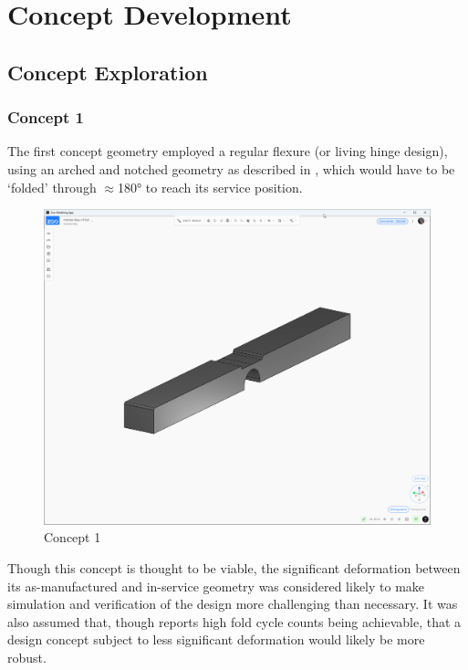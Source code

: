 \documentclass[10pt]{article}
\begin{document}
\section{Concept Development} \label{sec:concept-development}
\subsection{Concept Exploration}
\subsubsection{Concept 1}
The first concept geometry employed a regular flexure (or living hinge design), using an arched and
notched geometry as described in \cite{sciendo2022}, which would have to be `folded' through
$\approx$180° to reach its service position.

\begin{figure}[H]
	\centering
	\includegraphics[width=\textwidth]{./assets/05-concept-01.png}
	\caption{Concept 1}
	\label{fig:concept-01}
\end{figure}

Though this concept is thought to be viable, the significant deformation between its
as-manufactured and in-service geometry was considered likely to make simulation and verification
of the design more challenging than necessary. It was also assumed that, though \cite{sciendo2022}
reports high fold cycle counts being achievable, that a design concept subject to less significant
deformation would likely be more robust.
\end{document}
